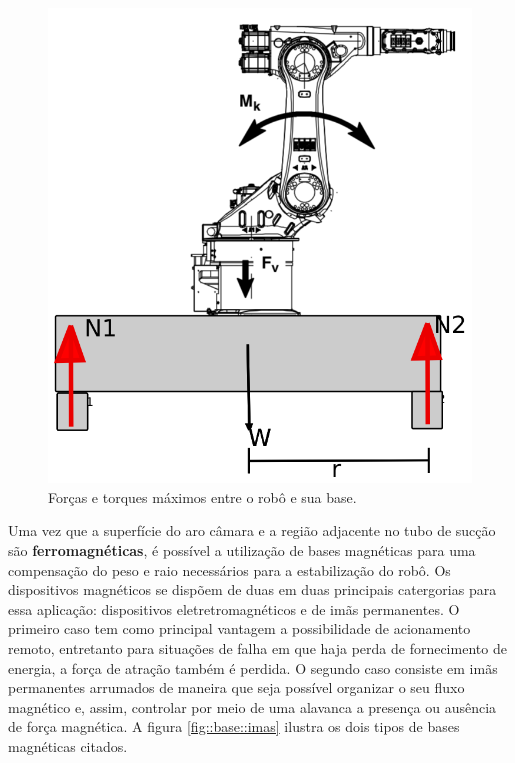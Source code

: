 \begin{figure}[H]
\centering
	\includegraphics[width=0.6\columnwidth]{sota/figs/base/tilt}
	\caption{Forças e torques máximos entre o robô e sua base.}
	\label{fig::tilt_robot}
\end{figure}


Uma vez que a superfície do aro câmara e a região adjacente no tubo de sucção
são \textbf{ferromagnéticas}, é possível a utilização de bases magnéticas para
uma compensação do peso e raio necessários para a estabilização do robô. Os
dispositivos magnéticos se dispõem de duas em duas principais catergorias para
essa aplicação:
dispositivos eletretromagnéticos e de imãs permanentes. O primeiro caso tem como
principal vantagem a possibilidade de acionamento remoto, entretanto para situações de
falha em que haja perda de fornecimento de energia, a força de atração também é
perdida. O segundo caso consiste em imãs permanentes arrumados de maneira que
seja possível organizar o seu fluxo magnético e, assim, controlar por meio de
uma alavanca a presença ou ausência de força magnética. A figura
\ref{fig::base::imas} ilustra os dois tipos de bases magnéticas citados.

